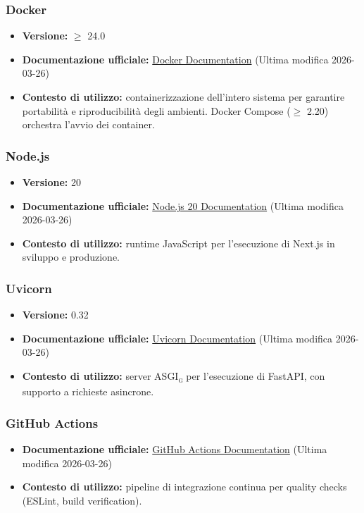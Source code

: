 \documentclass[a4paper, 11pt, oneside]{scrartcl}
\begin{document}
\subsubsection{Docker}
\begin{itemize}[noitemsep]
    \item \textbf{Versione:} $\geq$ 24.0
    \item \textbf{Documentazione ufficiale:} \href{https://docs.docker.com/}{Docker Documentation} (Ultima modifica 2026-03-26)
    \item \textbf{Contesto di utilizzo:} containerizzazione dell'intero sistema per garantire portabilit\`a e riproducibilit\`a degli ambienti. Docker Compose ($\geq$ 2.20) orchestra l'avvio dei container.
\end{itemize}

\subsubsection{Node.js}
\begin{itemize}[noitemsep]
    \item \textbf{Versione:} 20
    \item \textbf{Documentazione ufficiale:} \href{https://nodejs.org/docs/latest-v20.x/api/}{Node.js 20 Documentation} (Ultima modifica 2026-03-26)
    \item \textbf{Contesto di utilizzo:} runtime JavaScript per l'esecuzione di Next.js in sviluppo e produzione.
\end{itemize}

\subsubsection{Uvicorn}
\begin{itemize}[noitemsep]
    \item \textbf{Versione:} 0.32
    \item \textbf{Documentazione ufficiale:} \href{https://www.uvicorn.org/}{Uvicorn Documentation} (Ultima modifica 2026-03-26)
    \item \textbf{Contesto di utilizzo:} server ASGI\textsubscript{\textsc{g}} per l'esecuzione di FastAPI, con supporto a richieste asincrone.
\end{itemize}

\subsubsection{GitHub Actions}
\begin{itemize}[noitemsep]
    \item \textbf{Documentazione ufficiale:} \href{https://docs.github.com/actions}{GitHub Actions Documentation} (Ultima modifica 2026-03-26)
    \item \textbf{Contesto di utilizzo:} pipeline di integrazione continua per quality checks (ESLint, build verification).
\end{itemize}
\end{document}
